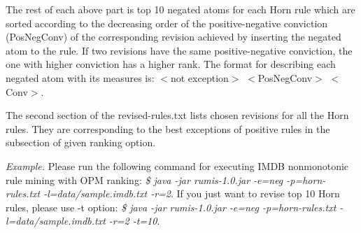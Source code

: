 The rest of each above part is top 10 negated atoms for each Horn rule which are sorted according to the decreasing order of the positive-negative conviction (PosNegConv) of the corresponding revision achieved by inserting the negated atom to the rule. If two revisions have the same positive-negative conviction, the one with higher conviction has a higher rank. The format for describing each negated atom with its measures is: $<$not exception$>$ $<$PosNegConv$>$ $<$Conv$>$.

The second section of the revised-rules.txt lists chosen revisions for all the Horn rules. They are corresponding to the best exceptions of positive rules in the subsection of given ranking option.

\textit{Example.} Please run the following command for executing IMDB nonmonotonic rule mining with OPM ranking: \textit{\$ java -jar rumis-1.0.jar -e=neg -p=horn-rules.txt -l=data/sample.imdb.txt -r=2}. If you just want to revise top 10 Horn rules, please use -t option: \textit{\$ java -jar rumis-1.0.jar -e=neg -p=horn-rules.txt -l=data/sample.imdb.txt -r=2 -t=10}.